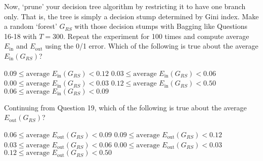 \documentclass[a4paper,10pt]{exam}
\begin{document}
\begin{questions}
	    \question Now, `prune' your decision tree algorithm by restricting it to have one branch only. That is, the tree is simply a decision stump determined by Gini index. Make a random `forest' $G_{RS}$ with those decision stumps with Bagging like Questions 16-18 with $T=300$. Repeat the experiment for 100 times and compute average $E_{\text{in}}$ and $E_{\text{out}}$ using the 0/1 error.
	    Which of the following is true about the average $E_{\text{in}}(G_{RS})$?
	    
	    \begin{choices}
	    	\CorrectChoice $0.09 \leq \mbox{average } E_{\text{in}}(G_{RS}) < 0.12$
	    	\choice $0.03 \leq \mbox{average } E_{\text{in}}(G_{RS}) < 0.06$
	    	\choice $0.00 \leq \mbox{average } E_{\text{in}}(G_{RS}) < 0.03$
	    	\choice $0.12 \leq \mbox{average } E_{\text{in}}(G_{RS}) < 0.50$
	    	\choice $0.06 \leq \mbox{average } E_{\text{in}}(G_{RS}) < 0.09$\\
	    \end{choices}
	    
	    \question Continuing from Question 19, which of the following is true about the average $E_{\text{out}}(G_{RS})$?
	    \begin{choices}
	      \choice $0.06 \leq \mbox{average } E_{\text{out}}(G_{RS}) < 0.09$
	      \choice $0.09 \leq \mbox{average } E_{\text{out}}(G_{RS}) < 0.12$
	      \choice $0.03 \leq \mbox{average } E_{\text{out}}(G_{RS}) < 0.06$
	      \choice $0.00 \leq \mbox{average } E_{\text{out}}(G_{RS}) < 0.03$
	      \CorrectChoice $0.12 \leq \mbox{average } E_{\text{out}}(G_{RS}) < 0.50$\\
	   \end{choices}
	\end{questions}
\end{document}
